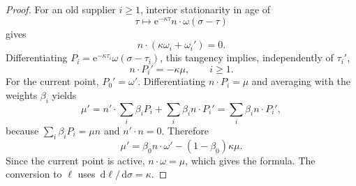 \documentclass[10pt,a4paper]{amsart}
\newcommand{\dd}{\,\mathrm{d}}
\newcommand{\e}{\mathrm{e}}
\begin{document}
\begin{proof}
For an old supplier $i\ge1$, interior stationarity in age of
\[
  \tau\longmapsto \e^{-\kappa\tau}n\cdot\omega(\sigma-\tau)
\]
gives
\[
  n\cdot(\kappa\omega_i+\omega_i')=0.
\]
Differentiating $P_i=\e^{-\kappa\tau_i}\omega(\sigma-\tau_i)$, this tangency implies, independently of $\tau_i'$,
\[
  n\cdot P_i'=-\kappa\mu,
  \qquad i\ge1.
\]
For the current point, $P_0'=\omega'$. Differentiating $n\cdot P_i=\mu$ and averaging with the weights $\beta_i$ yields
\[
  \mu'
  =n'\cdot\sum_i\beta_iP_i+
    \sum_i\beta_i n\cdot P_i'
  =\sum_i\beta_i n\cdot P_i',
\]
because $\sum_i\beta_iP_i=\mu n$ and $n'\cdot n=0$. Therefore
\[
  \mu'=\beta_0n\cdot\omega'-(1-\beta_0)\kappa\mu.
\]
Since the current point is active, $n\cdot\omega=\mu$, which gives the formula. The conversion to $\ell$ uses $\dd\ell/\dd\sigma=\kappa$.
\end{proof}
\end{document}
